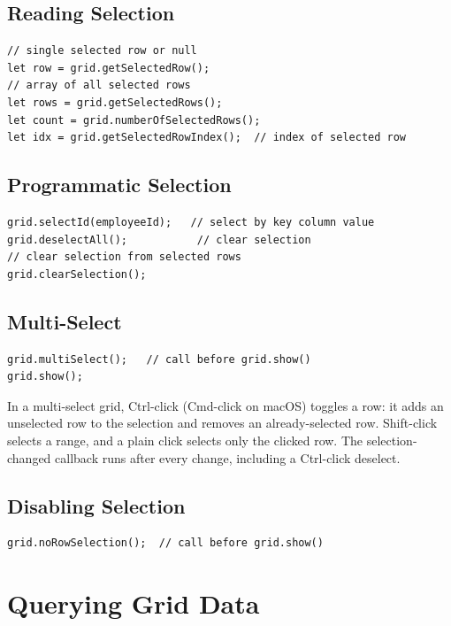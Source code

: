 \subsection{Reading Selection}

\begin{lstlisting}[style=javascript]
// single selected row or null
let row = grid.getSelectedRow();
// array of all selected rows
let rows = grid.getSelectedRows();
let count = grid.numberOfSelectedRows();
let idx = grid.getSelectedRowIndex();  // index of selected row
\end{lstlisting}

\subsection{Programmatic Selection}

\begin{lstlisting}[style=javascript]
grid.selectId(employeeId);   // select by key column value
grid.deselectAll();           // clear selection
// clear selection from selected rows
grid.clearSelection();
\end{lstlisting}

\subsection{Multi-Select}

\begin{lstlisting}[style=javascript]
grid.multiSelect();   // call before grid.show()
grid.show();
\end{lstlisting}

In a multi-select grid, Ctrl-click (Cmd-click on macOS) toggles a row: it adds an unselected row to the selection and removes an already-selected row. Shift-click selects a range, and a plain click selects only the clicked row. The selection-changed callback runs after every change, including a Ctrl-click deselect.

\subsection{Disabling Selection}

\begin{lstlisting}[style=javascript]
grid.noRowSelection();  // call before grid.show()
\end{lstlisting}

\section{Querying Grid Data}
\label{sec:grid-query}

